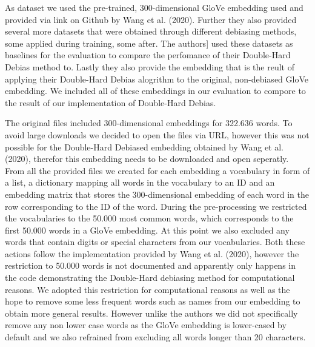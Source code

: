 \documentclass[
  english,
  man,floatsintext]{apa6}
\begin{document}
As dataset we used the pre-trained, 300-dimensional GloVe embedding used and provided via link on Github by Wang et al. (2020). Further they also provided several more datasets that were obtained through different debiasing methods, some applied during training, some after. The authors{]} used these datasets as baselines for the evaluation to compare the perfomance of their Double-Hard Debias method to. Lastly they also provide the embedding that is the reult of applying their Double-Hard Debias alogrithm to the original, non-debiased GloVe embedding. We included all of these embeddings in our evaluation to compore to the result of our implementation of Double-Hard Debias.

The original files included 300-dimensional embeddings for 322.636 words. To avoid large downloads we decided to open the files via URL, however this was not possible for the Double-Hard Debiased embedding obtained by Wang et al. (2020), therefor this embedding needs to be downloaded and open seperatly. From all the provided files we created for each embedding a vocabulary in form of a list, a dictionary mapping all words in the vocabulary to an ID and an embedding matrix that stores the 300-dimensional embedding of each word in the row corresponding to the ID of the word. During the pre-processing we restricted the vocabularies to the 50.000 most common words, which corresponds to the first 50.000 words in a GloVe embedding. At this point we also excluded any words that contain digits or special characters from our vocabularies. Both these actions follow the implementation provided by Wang et al. (2020), however the restriction to 50.000 words is not documented and apparently only happens in the code demonstrating the Double-Hard debiasing method for computational reasons. We adopted this restriction for computational reasons as well as the hope to remove some less frequent words such as names from our embedding to obtain more general results. However unlike the authors we did not specifically remove any non lower case words as the GloVe embedding is lower-cased by default and we also refrained from excluding all words longer than 20 characters.
\end{document}

